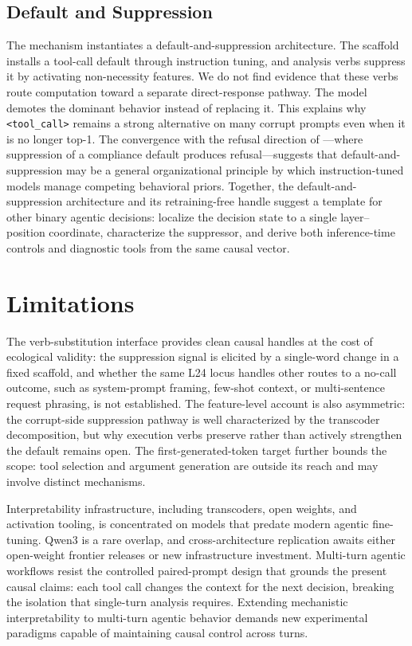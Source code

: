 \documentclass{article}
\begin{document}
\subsection{Default and Suppression}

The mechanism instantiates a default-and-suppression architecture. The
scaffold installs a tool-call default through instruction tuning, and
analysis verbs suppress it by activating non-necessity features. We do
not find evidence that these verbs route computation toward a separate
direct-response pathway.
The model demotes the dominant behavior instead of replacing it. This
explains why \texttt{<tool\_call>} remains a strong alternative on many
corrupt prompts even when it is no longer top-1.
The convergence with the refusal direction of \citet{arditi2024refusal}—where suppression of a compliance default produces refusal—suggests that default-and-suppression may be a general organizational principle by which instruction-tuned models manage competing behavioral priors.
Together, the default-and-suppression architecture and its retraining-free handle suggest a template for other binary agentic decisions: localize the decision state to a single layer–position coordinate, characterize the suppressor, and derive both inference-time controls and diagnostic tools from the same causal vector.
  
\section{Limitations}

The verb-substitution interface provides clean causal handles at the
cost of ecological validity: the suppression signal is elicited by a
single-word change in a fixed scaffold, and whether the same L24 locus
handles other routes to a no-call outcome, such as system-prompt
framing, few-shot context, or multi-sentence request phrasing, is not
established.
The feature-level account is also asymmetric: the corrupt-side
suppression pathway is well characterized by the transcoder
decomposition, but why execution verbs preserve rather than actively
strengthen the default remains open.
The first-generated-token target further bounds the scope: tool selection and
argument generation are outside its reach and may involve distinct
mechanisms.

Interpretability infrastructure, including transcoders, open weights,
and activation tooling, is concentrated on models that predate modern
agentic fine-tuning. Qwen3 is a rare overlap, and cross-architecture
replication awaits either open-weight frontier releases or new
infrastructure investment.
Multi-turn agentic workflows resist the controlled paired-prompt design
that grounds the present causal claims: each tool call changes the
context for the next decision, breaking the isolation that single-turn
analysis requires.
Extending mechanistic interpretability to multi-turn agentic behavior
demands new experimental paradigms capable of maintaining causal control
across turns.




\newpage

\newpage

\end{document}
